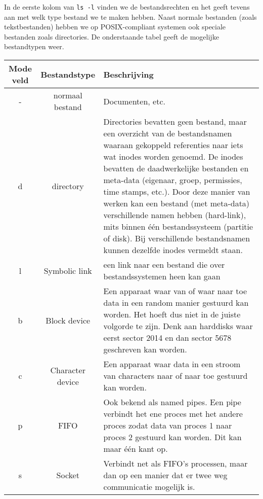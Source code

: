 In de eerste kolom van \texttt{ls -l} vinden we de bestandsrechten en het geeft tevens aan met welk type bestand we te maken hebben. Naast normale bestanden (zoals tekstbestanden) hebben we op POSIX-compliant systemen ook speciale bestanden zoals directories. De onderstaande tabel geeft de mogelijke bestandtypen weer.

\begin{tabularx}{5in}{ |c|c|X| }
\hline
	Mode veld & Bestandstype & Beschrijving \\
\hline
\hline
	- & normaal bestand & Documenten, etc. \\
\hline
	d & directory & Directories bevatten geen bestand, maar een overzicht van de bestandsnamen waaraan gekoppeld referenties naar iets wat inodes worden genoemd. De inodes bevatten de daadwerkelijke bestanden en meta-data (eigenaar, groep, permissies, time stamps, etc.). Door deze manier van werken kan een bestand (met meta-data) verschillende namen hebben (hard-link), mits binnen \'e\'en bestandssysteem (partitie of disk). Bij verschillende bestandsnamen kunnen dezelfde inodes vermeldt staan. \\
\hline
	l & Symbolic link & een link naar een bestand die over bestandssystemen heen kan gaan \\
\hline
	b & Block device & Een apparaat waar van of waar naar toe data in een random manier gestuurd kan worden. Het hoeft dus niet in de juiste volgorde te zijn. Denk aan harddisks waar eerst sector 2014 en dan sector 5678 geschreven kan worden. \\
\hline
	c & Character device & Een apparaat waar data in een stroom van characters naar of naar toe gestuurd kan worden. \\
\hline
	p & FIFO & Ook bekend als named pipes. Een pipe verbindt het ene proces met het andere proces zodat data van proces 1 naar proces 2 gestuurd kan worden. Dit kan maar \'e\'en kant op. \\
\hline
	s & Socket & Verbindt net als FIFO's processen, maar dan op een manier dat er twee weg communicatie mogelijk is. \\
\hline
\end{tabularx}

